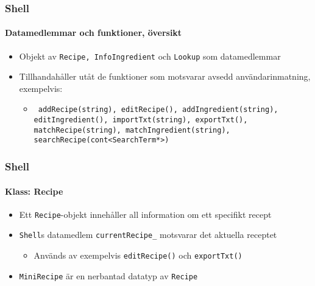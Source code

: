 %
%

\begin{frame}
  \frametitle{Shell}
  \framesubtitle{Datamedlemmar och funktioner, översikt}
  \begin{itemize}
    \item Objekt av \texttt{Recipe, InfoIngredient} och \texttt{Lookup} som datamedlemmar
    \item<2-> Tillhandahåller utåt de funktioner som motsvarar avsedd användarinmatning, exempelvis:
      \begin{itemize}
      \item<2-> \texttt{
        addRecipe(string), editRecipe(),
        addIngredient(string), editIngredient(),
        importTxt(string), exportTxt(),
        matchRecipe(string), matchIngredient(string),
        searchRecipe(cont<SearchTerm*>)
    }
      \end{itemize}
  \end{itemize} 
\end{frame}

\begin{frame}
  \frametitle{Shell}
  \framesubtitle{Klass: Recipe}
  \begin{itemize}
  \item Ett \texttt{Recipe}-objekt innehåller all information om ett specifikt recept
  \item<2-> \texttt{Shell}s datamedlem \texttt{currentRecipe\_} motsvarar det aktuella receptet
    \begin{itemize}
    \item Används av exempelvis \texttt{editRecipe()} och \texttt{exportTxt()}
    \end{itemize}
  \item<3-> \texttt{MiniRecipe} är en nerbantad datatyp av \texttt{Recipe}
  \end{itemize}
\end{frame}


